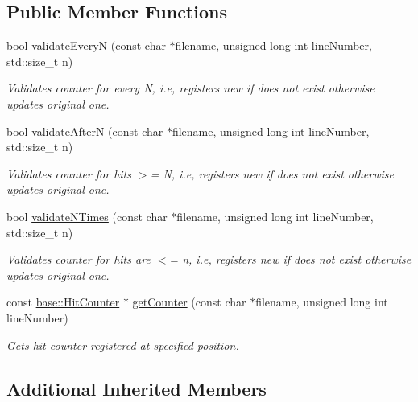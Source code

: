 \subsection*{Public Member Functions}
\begin{DoxyCompactItemize}
\item 
bool \hyperlink{classel_1_1base_1_1_registered_hit_counters_a18fecedc6be778cfd63e30cc42fb9c82}{validate\+Every\+N} (const char $\ast$filename, unsigned long int line\+Number, std\+::size\+\_\+t n)
\begin{DoxyCompactList}\small\item\em Validates counter for every N, i.\+e, registers new if does not exist otherwise updates original one. \end{DoxyCompactList}\item 
bool \hyperlink{classel_1_1base_1_1_registered_hit_counters_af6fa32ffd76776863d8bd2f0e9b341fc}{validate\+After\+N} (const char $\ast$filename, unsigned long int line\+Number, std\+::size\+\_\+t n)
\begin{DoxyCompactList}\small\item\em Validates counter for hits $>$= N, i.\+e, registers new if does not exist otherwise updates original one. \end{DoxyCompactList}\item 
bool \hyperlink{classel_1_1base_1_1_registered_hit_counters_aa270c1b9a8cc3a4d12cea45e07560d98}{validate\+N\+Times} (const char $\ast$filename, unsigned long int line\+Number, std\+::size\+\_\+t n)
\begin{DoxyCompactList}\small\item\em Validates counter for hits are $<$= n, i.\+e, registers new if does not exist otherwise updates original one. \end{DoxyCompactList}\item 
const \hyperlink{classel_1_1base_1_1_hit_counter}{base\+::\+Hit\+Counter} $\ast$ \hyperlink{classel_1_1base_1_1_registered_hit_counters_a0ca8cd04da5686048644e8cc1533b561}{get\+Counter} (const char $\ast$filename, unsigned long int line\+Number)
\begin{DoxyCompactList}\small\item\em Gets hit counter registered at specified position. \end{DoxyCompactList}\end{DoxyCompactItemize}
\subsection*{Additional Inherited Members}


